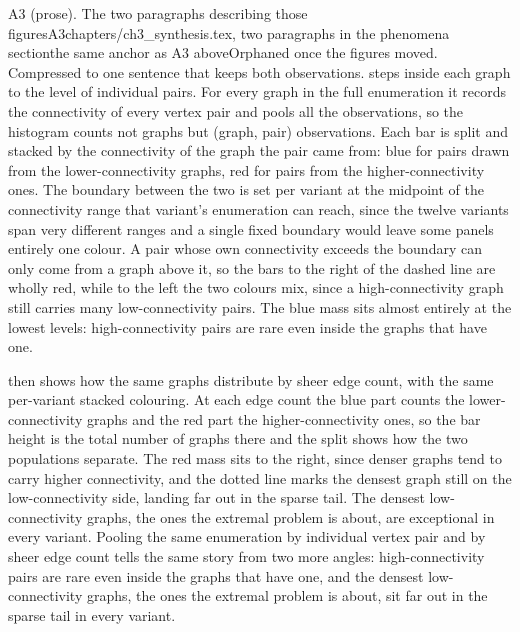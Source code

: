 \begin{offcutrewrite}{A3 (prose). The two paragraphs describing those figures}{A3}{chapters/ch3\_synthesis.tex, two paragraphs in the phenomena section}{the same anchor as A3 above}{Orphaned once the figures moved. Compressed to one sentence that keeps both observations.}
 steps inside each graph to the level of individual pairs. For every graph in the full enumeration it records the connectivity of every vertex pair and pools all the observations, so the histogram counts not graphs but (graph, pair) observations. Each bar is split and stacked by the connectivity of the graph the pair came from: blue for pairs drawn from the lower-connectivity graphs, red for pairs from the higher-connectivity ones. The boundary between the two is set per variant at the midpoint of the connectivity range that variant's enumeration can reach, since the twelve variants span very different ranges and a single fixed boundary would leave some panels entirely one colour. A pair whose own connectivity exceeds the boundary can only come from a graph above it, so the bars to the right of the dashed line are wholly red, while to the left the two colours mix, since a high-connectivity graph still carries many low-connectivity pairs. The blue mass sits almost entirely at the lowest levels: high-connectivity pairs are rare even inside the graphs that have one.

 then shows how the same graphs distribute by sheer edge count, with the same per-variant stacked colouring. At each edge count the blue part counts the lower-connectivity graphs and the red part the higher-connectivity ones, so the bar height is the total number of graphs there and the split shows how the two populations separate. The red mass sits to the right, since denser graphs tend to carry higher connectivity, and the dotted line marks the densest graph still on the low-connectivity side, landing far out in the sparse tail. The densest low-connectivity graphs, the ones the extremal problem is about, are exceptional in every variant.
\nowreads
Pooling the same enumeration by individual vertex pair and by sheer edge count tells the same story from two more angles: high-connectivity pairs are rare even inside the graphs that have one, and the densest low-connectivity graphs, the ones the extremal problem is about, sit far out in the sparse tail in every variant.
\end{offcutrewrite}

